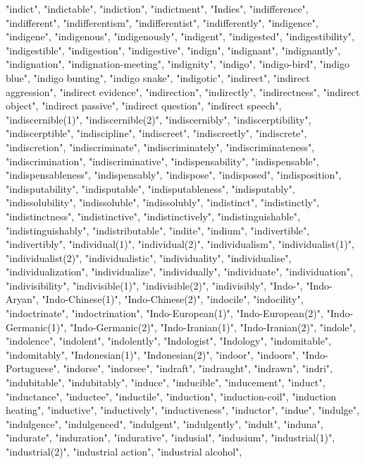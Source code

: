 "indict",
"indictable",
"indiction",
"indictment",
"Indies",
"indifference",
"indifferent",
"indifferentism",
"indifferentist",
"indifferently",
"indigence",
"indigene",
"indigenous",
"indigenously",
"indigent",
"indigested",
"indigestibility",
"indigestible",
"indigestion",
"indigestive",
"indign",
"indignant",
"indignantly",
"indignation",
"indignation-meeting",
"indignity",
"indigo",
"indigo-bird",
"indigo blue",
"indigo bunting",
"indigo snake",
"indigotic",
"indirect",
"indirect aggression",
"indirect evidence",
"indirection",
"indirectly",
"indirectness",
"indirect object",
"indirect passive",
"indirect question",
"indirect speech",
"indiscernible(1)",
"indiscernible(2)",
"indiscernibly",
"indiscerptibility",
"indiscerptible",
"indiscipline",
"indiscreet",
"indiscreetly",
"indiscrete",
"indiscretion",
"indiscriminate",
"indiscriminately",
"indiscriminateness",
"indiscrimination",
"indiscriminative",
"indispensability",
"indispensable",
"indispensableness",
"indispensably",
"indispose",
"indisposed",
"indisposition",
"indisputability",
"indisputable",
"indisputableness",
"indisputably",
"indissolubility",
"indissoluble",
"indissolubly",
"indistinct",
"indistinctly",
"indistinctness",
"indistinctive",
"indistinctively",
"indistinguishable",
"indistinguishably",
"indistributable",
"indite",
"indium",
"indivertible",
"indivertibly",
"individual(1)",
"individual(2)",
"individualism",
"individualist(1)",
"individualist(2)",
"individualistic",
"individuality",
"individualise",
"individualization",
"individualize",
"individually",
"individuate",
"individuation",
"indivisibility",
"indivisible(1)",
"indivisible(2)",
"indivisibly",
"Indo-",
"Indo-Aryan",
"Indo-Chinese(1)",
"Indo-Chinese(2)",
"indocile",
"indocility",
"indoctrinate",
"indoctrination",
"Indo-European(1)",
"Indo-European(2)",
"Indo-Germanic(1)",
"Indo-Germanic(2)",
"Indo-Iranian(1)",
"Indo-Iranian(2)",
"indole",
"indolence",
"indolent",
"indolently",
"Indologist",
"Indology",
"indomitable",
"indomitably",
"Indonesian(1)",
"Indonesian(2)",
"indoor",
"indoors",
"Indo-Portuguese",
"indorse",
"indorsee",
"indraft",
"indraught",
"indrawn",
"indri",
"indubitable",
"indubitably",
"induce",
"inducible",
"inducement",
"induct",
"inductance",
"inductee",
"inductile",
"induction",
"induction-coil",
"induction heating",
"inductive",
"inductively",
"inductiveness",
"inductor",
"indue",
"indulge",
"indulgence",
"indulgenced",
"indulgent",
"indulgently",
"indult",
"induna",
"indurate",
"induration",
"indurative",
"indusial",
"indusium",
"industrial(1)",
"industrial(2)",
"industrial action",
"industrial alcohol",

